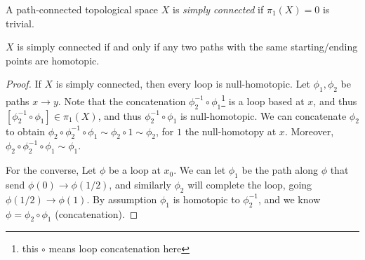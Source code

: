 \begin{definition}\label{dfn:owo}
	A path-connected topological space $X$ is \emph{simply connected} if $\pi _1(X)=0$ is trivial.
\end{definition}

\begin{proposition}\label{prp:idk}
	$X$ is simply connected if and only if any two paths with the same starting/ending points are homotopic.
\end{proposition}
\begin{proof}
	If $X$ is simply connected, then every loop is null-homotopic. Let $\phi _1,\phi _2$ be paths $x\to y$. Note that the concatenation $\phi _2^{-1} \circ \phi _1$\footnote{this $\circ $ means loop concatenation here} is a loop based at $x$, and thus $\left[ \phi _2^{-1} \circ \phi _1 \right] \in \pi _1(X)$, and thus $\phi _2^{-1} \circ \phi _1$ is null-homotopic. We can concatenate $\phi _2$ to obtain $\phi _2 \circ \phi _2^{-1} \circ \phi _1 \sim \phi _2 \circ 1\sim \phi _2$, for $1$ the null-homotopy at $x$. Moreover, $\phi _2\circ \phi _2^{-1} \circ \phi _1\sim \phi _1$.

	For the converse, Let $\phi $ be a loop at $x_0$. We can let $\phi _1$ be the path along $\phi $ that send $\phi (0)\to \phi (1/2)$, and similarly $\phi _2$ will complete the loop, going $\phi (1/2)\to \phi (1)$. By assumption $\phi _1$ is homotopic to $\phi _2^{-1} $, and we know $\phi =\phi _2\circ \phi _1$ (concatenation).
\end{proof}

